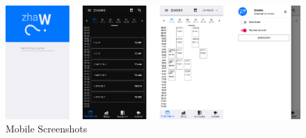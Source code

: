 \begin{markdown}
\begin{figure}[H]
  \includegraphics[width=16.5cm, center]{../Mockups/screenshots.png}
  \caption{\textsf{Mobile Screenshots}}
\end{figure}

\end{markdown}
